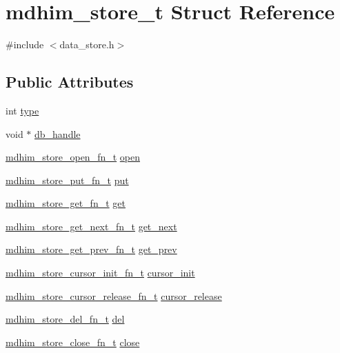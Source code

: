 \hypertarget{structmdhim__store__t}{\section{mdhim\-\_\-store\-\_\-t Struct Reference}
\label{d1/dab/structmdhim__store__t}
}


{\ttfamily \#include $<$data\-\_\-store.\-h$>$}

\subsection*{Public Attributes}
\begin{DoxyCompactItemize}
\item 
int \hyperlink{structmdhim__store__t_a00f8694bd01cc8cfda7479b7384e083b}{type}
\item 
void $\ast$ \hyperlink{structmdhim__store__t_ab9c004b5de88a17f058146ef0a91e696}{db\-\_\-handle}
\item 
\hyperlink{data__store_8h_af26a1cac009a37a5d7f0ac20ee19fc61}{mdhim\-\_\-store\-\_\-open\-\_\-fn\-\_\-t} \hyperlink{structmdhim__store__t_a8d77b86eb31d677f36b46f653865ea1d}{open}
\item 
\hyperlink{data__store_8h_a875c1ab1167b729dbcdbfb7d2b1ad991}{mdhim\-\_\-store\-\_\-put\-\_\-fn\-\_\-t} \hyperlink{structmdhim__store__t_a5a33c9ea5897fdf71a54573ea49fef18}{put}
\item 
\hyperlink{data__store_8h_a8f519c64037ae01264558808566cbb2e}{mdhim\-\_\-store\-\_\-get\-\_\-fn\-\_\-t} \hyperlink{structmdhim__store__t_a6ad0450519e040a4ae11631aa6202b24}{get}
\item 
\hyperlink{data__store_8h_a920fa97b0bf3d87d9376232430344f81}{mdhim\-\_\-store\-\_\-get\-\_\-next\-\_\-fn\-\_\-t} \hyperlink{structmdhim__store__t_a0e42f0e911de2adb2616228f3ffbfd99}{get\-\_\-next}
\item 
\hyperlink{data__store_8h_ab8c6a76ed0f5920f8fbcb19b9e0d3ff2}{mdhim\-\_\-store\-\_\-get\-\_\-prev\-\_\-fn\-\_\-t} \hyperlink{structmdhim__store__t_a43c5445119b911e3da419f26c5aae232}{get\-\_\-prev}
\item 
\hyperlink{data__store_8h_a987c504ec34ab0559d95d014034a2585}{mdhim\-\_\-store\-\_\-cursor\-\_\-init\-\_\-fn\-\_\-t} \hyperlink{structmdhim__store__t_ade2a566d298ab48a666cf2cfdec58f25}{cursor\-\_\-init}
\item 
\hyperlink{data__store_8h_a7c97bfb9cd30831f1ab1dbdfd9aa25e0}{mdhim\-\_\-store\-\_\-cursor\-\_\-release\-\_\-fn\-\_\-t} \hyperlink{structmdhim__store__t_a36a8838ceb12bd2d454f7930e52ccaa2}{cursor\-\_\-release}
\item 
\hyperlink{data__store_8h_aabc5c9879c73c85349c660530f687f52}{mdhim\-\_\-store\-\_\-del\-\_\-fn\-\_\-t} \hyperlink{structmdhim__store__t_a3cf5374069e55121b50e4567a1e5e2e1}{del}
\item 
\hyperlink{data__store_8h_ab4037e75447b1b75d7cea3555024aa74}{mdhim\-\_\-store\-\_\-close\-\_\-fn\-\_\-t} \hyperlink{structmdhim__store__t_a41daefe3effd7441930c4296fb6002de}{close}
\end{DoxyCompactItemize}


